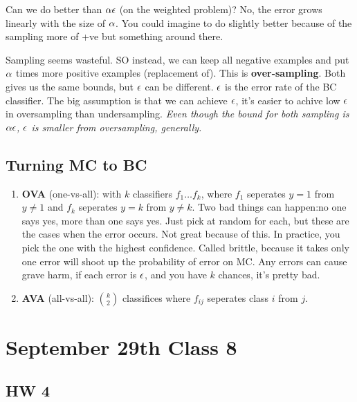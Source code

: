 Can we do better than $\alpha \epsilon$ (on the weighted problem)? No, the
error grows linearly with the size of $\alpha$. You could imagine to do
slightly better because of the sampling more of +ve but something
around there.

Sampling seems wasteful. SO instead, we can keep all negative
examples and put $\alpha$ times more positive examples (replacement
of). This is \textbf{over-sampling}. Both gives us the same bounds,
but $\epsilon$ can be different. $\epsilon$ is the error rate of the BC
classifier. The big assumption is that we can achieve $\epsilon$, it's
easier to achive low $\epsilon$ in oversampling than undersampling. \emph{Even
though the bound for both sampling is $\alpha\epsilon$, $\epsilon$ is smaller
from oversampling, generally.}

\subsection{Turning MC to BC}
\label{sec:MC2BC}

\begin{enumerate}
\item \textbf{OVA} (one-vs-all): with $k$ classifiers $f_1\dots f_k$, where $f_1$ seperates
  $y=1$ from $y\neq 1$ and $f_k$ seperates $y=k$ from $y\neq k$. Two
  bad things can happen:no one says yes, more than one says yes. Just
  pick at random for each, but these are the cases when the error
  occurs. Not great because of this. In practice, you pick the one
  with the highest confidence. Called brittle, because it takes only
  one error will shoot up the probability of error on MC. Any errors
 can cause grave harm, if each error is $\epsilon$, and you have $k$
 chances, it's pretty bad.
\item \textbf{AVA} (all-vs-all): $ k \choose 2 $ classifices where
  $f_{ij}$ seperates class $i$ from $j$.
\end{enumerate}

\pagebreak

\section{September 29th Class 8}
\label{sec:class8}

\subsection{HW 4}
\label{sec:hw4}

